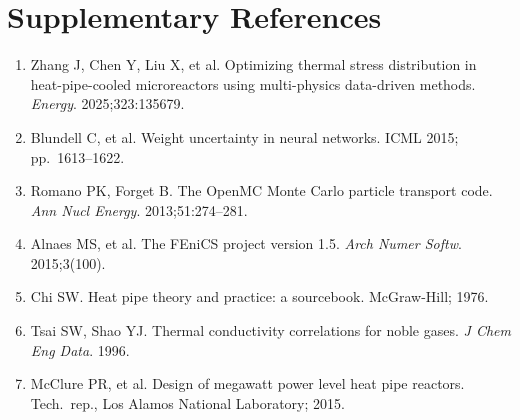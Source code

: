 \documentclass[11pt,a4paper]{article}
\begin{document}
\section*{Supplementary References}

\begin{enumerate}\small
\setcounter{enumi}{8}
\item Zhang J, Chen Y, Liu X, et al. Optimizing thermal stress
      distribution in heat-pipe-cooled microreactors using multi-physics
      data-driven methods. \textit{Energy}. 2025;323:135679.
\item Blundell C, et al. Weight uncertainty in neural networks. ICML
      2015; pp.\ 1613--1622.
\item Romano PK, Forget B. The OpenMC Monte Carlo particle transport
      code. \textit{Ann Nucl Energy}. 2013;51:274--281.
\item Alnaes MS, et al. The FEniCS project version 1.5. \textit{Arch
      Numer Softw}. 2015;3(100).
\item Chi SW. Heat pipe theory and practice: a sourcebook.
      McGraw-Hill; 1976.
\item Tsai SW, Shao YJ. Thermal conductivity correlations for noble
      gases. \textit{J Chem Eng Data}. 1996.
\item McClure PR, et al. Design of megawatt power level heat pipe
      reactors. Tech.\ rep., Los Alamos National Laboratory; 2015.
\end{enumerate}
\end{document}
